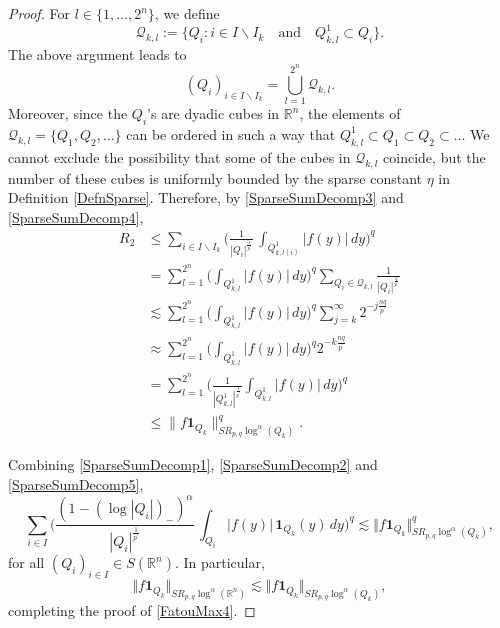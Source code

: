 \documentclass[10pt,a4paper]{amsart}
\begin{document}
\begin{proof}
For $l \in\{1, \ldots, 2^{n}\}$, we define
\[
\mathcal{Q}_{k, l} := \{Q_{i} : i \in I \backslash I_{k} \quad\text{and} \quad
Q^{1}_{k, l} \subset Q_{i}\}.
\]
The above argument leads to
\begin{equation}
\label{SparseSumDecomp4}(Q_{i})_{i \in I \backslash I_{k}} = \bigcup
_{l=1}^{2^{n}} \mathcal{Q}_{k, l}.
\end{equation}
Moreover, since the $Q_{i}$'s are dyadic cubes in $\mathbb{R}^{n}$, the
elements of $\mathcal{Q}_{k, l} = \{Q_{1}, Q_{2}, \ldots\}$ can be ordered in
such a way that
$
Q^{1}_{k, l} \subset Q_{1} \subset Q_{2} \subset\ldots
$
We cannot exclude the possibility that some of the cubes in $\mathcal{Q}_{k,
l}$ coincide, but the number of these cubes is uniformly bounded by the sparse
constant $\eta$ in Definition \ref{DefnSparse}. Therefore, by
\eqref{SparseSumDecomp3} and \eqref{SparseSumDecomp4},
\begin{align}
R_{2}  &  \leq\sum_{i \in I \backslash I_{k}} \bigg( \frac{1}{|Q_{i}%
|^{\frac{1}{p^{\prime}}}} \, \int_{Q^{1}_{k, l(i)}} |f(y)| \, dy
\bigg)^{q}\nonumber\\
&  = \sum_{l=1}^{2^{n}} \bigg(\int_{Q^{1}_{k, l}} |f(y)| \, dy \bigg)^{q}
\sum_{Q_{i} \in\mathcal{Q}_{k, l}} \frac{1}{|Q_{i}|^{\frac{q}{p^{\prime}}}%
}\nonumber\\
&  \lesssim\sum_{l=1}^{2^{n}} \bigg(\int_{Q^{1}_{k, l}} |f(y)| \, dy \bigg)^{q}
\sum_{j=k}^{\infty}2^{-j \frac{n q}{p^{\prime}}}\nonumber\\
&  \approx\sum_{l=1}^{2^{n}} \bigg(\int_{Q^{1}_{k, l}} |f(y)| \, dy \bigg)^{q}
2^{-k \frac{n q}{p^{\prime}}}\nonumber\\
&  = \sum_{l=1}^{2^{n}} \bigg(\frac{1}{|Q^{1}_{k, l}|^{\frac{1}{p^{\prime}}}}
\int_{Q^{1}_{k, l}} |f(y)| \, dy \bigg)^{q}\nonumber\\
&  \leq\|f \mathbf{1}_{Q_{k}}\|^{q}_{SR_{p, q} \log^{\alpha}(Q_{k})}.
\label{SparseSumDecomp5}%
\end{align}


Combining \eqref{SparseSumDecomp1}, \eqref{SparseSumDecomp2} and
\eqref{SparseSumDecomp5},
\[
\sum_{i\in I}\bigg(\frac{(1-(\log|Q_{i}|)_{-})^{\alpha}}{|Q_{i}|^{\frac
{1}{p^{\prime}}}}\,\int_{Q_{i}}|f(y)|\,\mathbf{1}_{Q_{k}}(y)\,dy\bigg)^{q}%
\lesssim\Vert f\mathbf{1}_{Q_{k}}\Vert_{SR_{p,q}\log^{\alpha}(Q_{k})}^{q},
\]
for all $(Q_{i})_{i\in I}\in S(\mathbb{R}^{n})$. In particular,
\[
\Vert f\mathbf{1}_{Q_{k}}\Vert_{SR_{p,q}\log^{\alpha}(\mathbb{R}^{n})}%
\lesssim\Vert f\mathbf{1}_{Q_{k}}\Vert_{SR_{p,q}\log^{\alpha}(Q_{k})},
\]
completing the proof of \eqref{FatouMax4}.


\end{proof}
\end{document}
